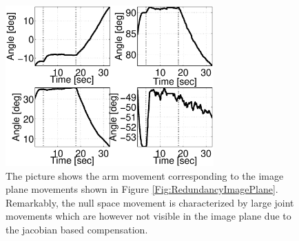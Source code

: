   \begin{figure}
  \begin{center}
	\includegraphics[width=80mm]{Figure/RedundancyArm.eps}
	\end{center}
\caption{The picture shows the arm movement corresponding to the image plane movements shown in Figure \ref{Fig:RedundancyImagePlane}. Remarkably, the null space movement is characterized by large joint movements which are however not visible in the image plane due to the jacobian based compensation.} \label{Fig:RedundancyArm}
  \end{figure}